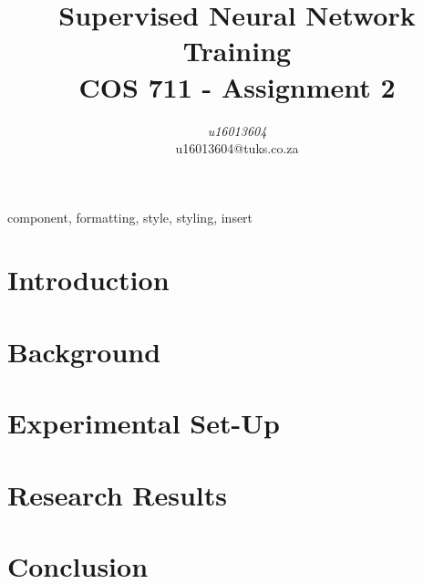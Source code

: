 \documentclass[conference]{IEEEtran}
\begin{document}
\title{
	Supervised Neural Network Training\\
	{\footnotesize COS 711 - Assignment 2}
}

\author{
\textit{u16013604} \\
u16013604@tuks.co.za
}

\maketitle

\begin{abstract}
	
\end{abstract}

\begin{IEEEkeywords}
component, formatting, style, styling, insert \cite{s-j-kwon-anns}
\end{IEEEkeywords}

\section{Introduction}


\section{Background}


\section{Experimental Set-Up}


\section{Research Results}


\section{Conclusion}






\vspace{12pt}
\color{red}
\end{document}

